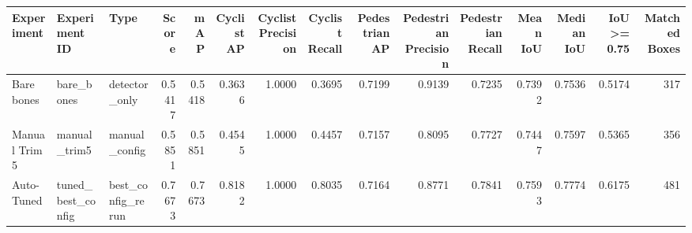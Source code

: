 \begin{tabular}{lllrrrrrrrrrrrr}
\toprule
Experiment & Experiment ID & Type & Score & mAP & Cyclist AP & Cyclist Precision & Cyclist Recall & Pedestrian AP & Pedestrian Precision & Pedestrian Recall & Mean IoU & Median IoU & IoU >= 0.75 & Matched Boxes \\
\midrule
Bare bones & bare_bones & detector_only & 0.5417 & 0.5418 & 0.3636 & 1.0000 & 0.3695 & 0.7199 & 0.9139 & 0.7235 & 0.7392 & 0.7536 & 0.5174 & 317 \\
Manual Trim 5 & manual_trim5 & manual_config & 0.5851 & 0.5851 & 0.4545 & 1.0000 & 0.4457 & 0.7157 & 0.8095 & 0.7727 & 0.7447 & 0.7597 & 0.5365 & 356 \\
Auto-Tuned & tuned_best_config & best_config_rerun & 0.7673 & 0.7673 & 0.8182 & 1.0000 & 0.8035 & 0.7164 & 0.8771 & 0.7841 & 0.7593 & 0.7774 & 0.6175 & 481 \\
\bottomrule
\end{tabular}
